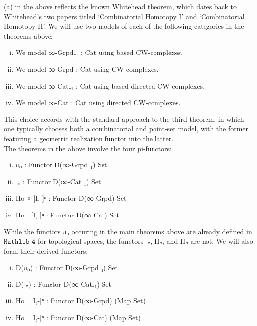 \documentclass{book}
\theoremstyle{definition}
\begin{document}
(a) in the above reflects the known Whitehead theorem, which dates back to Whitehead's two papers titled `Combinatorial Homotopy I' and `Combinatorial Homotopy II'. We will use two models of each of the following categories in the theorems above:

\begin{enumerate}[(i)]
\item We model ∞-Grpd₋₁ : Cat using based CW-complexes.
\item We model ∞-Grpd : Cat using CW-complexes.
\item We model ∞-Cat₋₁ : Cat using based directed CW-complexes.
\item We model ∞-Cat : Cat using directed CW-complexes.
\end{enumerate}

This choice accords with the standard approach to the third theorem, in which one typically chooses both a combinatorial and point-set model, with the former featuring a \href{https://github.com/leanprover-community/mathlib4/blob/8666bd82efec40b8b3a5abca02dc9b24bbdf2652/Mathlib/AlgebraicTopology/SimplicialSet.lean#L235-L236}{geometric realization functor} into the latter.\\

The theorems in the above involve the four pi-functors:

\begin{enumerate}[(i)]
\item πₙ : Functor D(∞-Grpd₋₁) Set
\item π⃗ₙ : Functor D(∞-Cat₋₁) Set
\item Ho ∘ [I,-]ⁿ : Functor D(∞-Grpd) Set
\item Ho ∘ [I⃗,-]ⁿ : Functor D(∞-Cat) Set
\end{enumerate}

While the functors πₙ occuring in the main theorems above are already defined in $\texttt{Mathlib 4}$ for topological spaces, the functors π⃗ₙ, Πₙ, and Π⃗ₙ are not. We will also form their derived functors:

\begin{enumerate}[(i)]
\item D(πₙ) : Functor D(∞-Grpd₋₁) Set
\item D(π⃗ₙ) : Functor D(∞-Cat₋₁) Set
\item Ho ∘ [I⃗,-]ⁿ : Functor D(∞-Grpd) (Map Set)
\item Ho ∘ [I⃗,-]ⁿ : Functor D(∞-Cat) (Map Set)
\end{enumerate}
\end{document}
